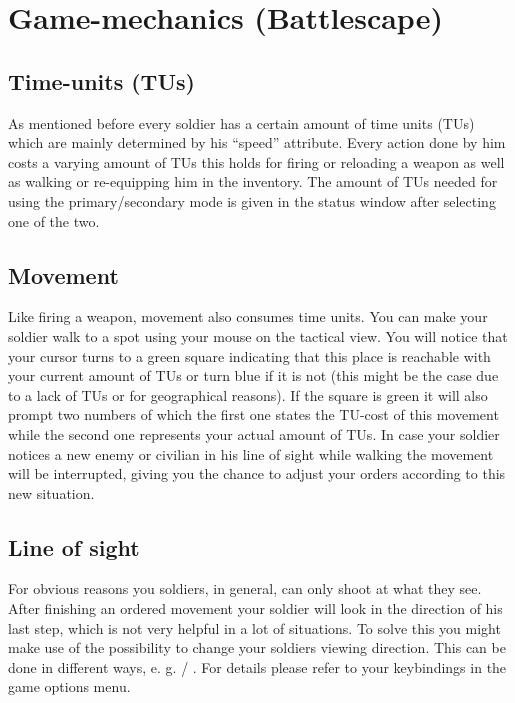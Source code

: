 \section{Game-mechanics (Battlescape)}

\subsection{Time-units (TUs)}
As mentioned before every soldier has a certain amount of time units (TUs) which are mainly determined by his ``speed'' attribute. Every action done by him costs a varying amount of TUs this holds for firing or reloading a weapon as well as walking or re-equipping him in the inventory. The amount of TUs needed for using the primary/secondary mode is given in the status window after selecting one of the two.

\subsection{Movement}
Like firing a weapon, movement also consumes time units. You can make your soldier walk to a spot using your mouse on the tactical view. You will notice that your cursor turns to a green square indicating that this place is reachable with your current amount of TUs or turn blue if it is not (this might be the case due to a lack of TUs or for geographical reasons). If the square is green it will also prompt two numbers of which the first one states the TU-cost of this movement while the second one represents your actual amount of TUs. In case your soldier notices a new enemy or civilian in his line of sight while walking the movement will be interrupted, giving you the chance to adjust your orders according to this new situation.

\subsection{Line of sight}
For obvious reasons you soldiers, in general, can only shoot at what they see. After finishing an ordered movement your soldier will look in the direction of his last step, which is not very helpful in a lot of situations. To solve this you might make use of the possibility to change your soldiers viewing direction. This can be done in different ways, e. g.  / . For details please refer to your keybindings in the game options menu.

